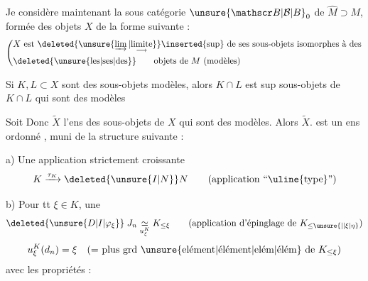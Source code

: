 Je considère maintenant la sous catégorie ${\unsure{\mathscr B|\mathcal B|B}}_0$ de $\widehat M\supset M$, formée des objets $X$ de la forme suivante :
\[
\left(\begin{aligned}
&X\text{ est }\deleted{\unsure{\varinjlim|\underset{\longrightarrow}{\text{limite}}}}\inserted{\text{sup}}\text{ de ses sous-objets isomorphes à des}\\
&\deleted{\text{\unsure{les|ses|des}}}\qquad\text{objets de }M\text{ (modèles)}
\end{aligned}\right.
\]

Si $K,L\subset X$ sont des sous-objets modèles, alors $K\cap L$ est sup  sous-objets de $K\cap L$ qui sont des modèles

Soit Donc $\widetilde X$ l'ens des  sous-objets de $X$ qui sont des modèles. Alors $\widetilde X$. est un ens ordonné , muni de la structure suivante  : 

a)  Une application strictement croissante
\[
K\xrightarrow{\tau_K}\deleted{\unsure{I|N}}N
\qquad\text{(application ``\uline{type}'')}
\]

b) Pour tt $\xi\in K$,  une  
\[
\deleted{\unsure{D|I|\varphi_\xi}}\;J_n\underset{u_\xi^K}{\simeq}K_{\leq\xi}
\qquad\text{(application d'épinglage de }K_{\leq\unsure{\mid|\xi|\eta}}\text{)}
\]
\[
u_\xi^K(d_n)=\xi\quad\text{(= plus grd \unsure{elément|élément|elém|élém} de }K_{\leq\xi}\text{)}
\]
avec  les propriétés  :
